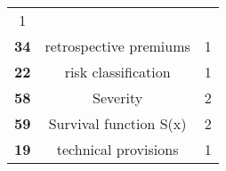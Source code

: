 \documentclass[]{book}
\theoremstyle{definition}
\theoremstyle{definition}
\theoremstyle{definition}
\theoremstyle{remark}
\begin{document}
\begin{longtable}[]{@{}ccc@{}}
\begin{minipage}[t]{0.29\columnwidth}
1\strut
\end{minipage}\tabularnewline
\begin{minipage}[t]{0.11\columnwidth}\centering\strut
\textbf{34}\strut
\end{minipage} & \begin{minipage}[t]{0.42\columnwidth}\centering\strut
retrospective premiums\strut
\end{minipage} & \begin{minipage}[t]{0.29\columnwidth}\centering\strut
1\strut
\end{minipage}\tabularnewline
\begin{minipage}[t]{0.11\columnwidth}\centering\strut
\textbf{22}\strut
\end{minipage} & \begin{minipage}[t]{0.42\columnwidth}\centering\strut
risk classification\strut
\end{minipage} & \begin{minipage}[t]{0.29\columnwidth}\centering\strut
1\strut
\end{minipage}\tabularnewline
\begin{minipage}[t]{0.11\columnwidth}\centering\strut
\textbf{58}\strut
\end{minipage} & \begin{minipage}[t]{0.42\columnwidth}\centering\strut
Severity\strut
\end{minipage} & \begin{minipage}[t]{0.29\columnwidth}\centering\strut
2\strut
\end{minipage}\tabularnewline
\begin{minipage}[t]{0.11\columnwidth}\centering\strut
\textbf{59}\strut
\end{minipage} & \begin{minipage}[t]{0.42\columnwidth}\centering\strut
Survival function S(x)\strut
\end{minipage} & \begin{minipage}[t]{0.29\columnwidth}\centering\strut
2\strut
\end{minipage}\tabularnewline
\begin{minipage}[t]{0.11\columnwidth}\centering\strut
\textbf{19}\strut
\end{minipage} & \begin{minipage}[t]{0.42\columnwidth}\centering\strut
technical provisions\strut
\end{minipage} & \begin{minipage}[t]{0.29\columnwidth}\centering\strut
1\strut
\end{minipage}\tabularnewline

\end{longtable}
\end{document}
